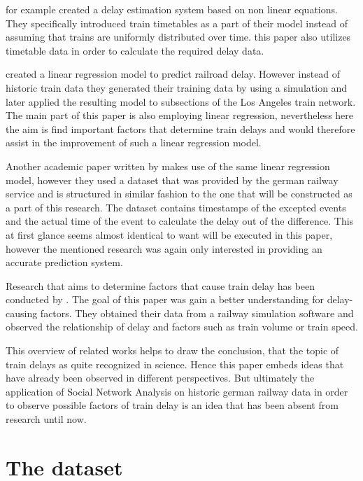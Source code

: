 \documentclass[12pt,a4paper]{article}
\begin{document}
\cite{Cheng90} for example created a delay estimation system based on non linear equations. 
They specifically introduced train timetables as a part of their model instead of assuming that trains are uniformly distributed over time. 
this paper also utilizes timetable data in order to calculate the required delay data.

\cite{Murali2010} created a linear regression model to predict railroad delay. 
However instead of historic train data they generated their training data by using a simulation and later applied the resulting model to subsections of the Los Angeles train network. 
The main part of this paper is also employing linear regression, nevertheless here the aim is find important factors that determine train delays and would therefore assist in the improvement of such a linear regression model.

Another academic paper written by \cite{Hauck2020} makes use of the same linear regression model, however they used a dataset that was provided by the german railway service and is structured in similar fashion to the one that will be constructed as a part of this research. 
The dataset contains timestamps of the excepted events and the actual time of the event to calculate the delay out of the difference. This at first glance seems almost identical to want will be executed in this paper, however the mentioned research was again only interested in providing an accurate prediction system.

Research that aims to determine factors that cause train delay has been conducted by \cite{Dingler2010}. The goal of this paper was gain a better understanding for delay-causing factors. 
They obtained their data from a railway simulation software and observed the relationship of delay and factors such as train volume or train speed.

This overview of related works helps to draw the conclusion, that the topic of train delays as quite recognized in science.
Hence this paper embeds ideas that have already been observed in different perspectives. 
But ultimately the application of Social Network Analysis on historic german railway data in order to observe possible factors of train delay is an idea that has been absent from research until now.  

\maketitle
\section{\label{sec:Dataset}The dataset}
\end{document}
